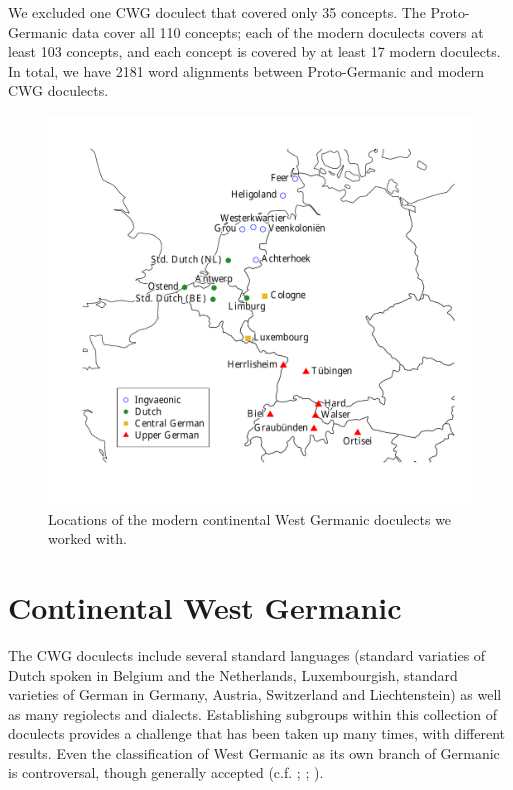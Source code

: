 \documentclass[a4paper]{article}
\begin{document}
We excluded one CWG doculect that covered only 35 concepts. %
The Proto-Germanic data cover all 110 concepts; each of the modern doculects covers at least 103 concepts, and each concept is covered by at least 17 modern doculects.
In total, we have 2181 word alignments between Proto-Germanic and modern CWG doculects.


\begin{figure}[h]
\centering
\includegraphics[width=\textwidth]{figures/map.pdf}
\caption{Locations of the modern continental West Germanic doculects we worked with.}
\label{fig:map}
\end{figure}


\section{Continental West Germanic}
\label{sec:cwg}

The CWG doculects include several standard languages
(standard variaties of Dutch spoken in Belgium and the Netherlands,
Luxembourgish, standard varieties of German in
Germany, Austria, Switzerland and Liechtenstein)
as well as many regiolects and dialects.
Establishing subgroups within this collection of doculects provides a challenge
that has been taken up many times, with different results.
Even the classification of West Germanic
as its own branch of Germanic is controversal,
though generally accepted
(c.f. \citet{voyles1971problem}; \citet[pp. 7-8]{harbert2007germanic}; \citet{ringe2012cladistic}).
\end{document}
